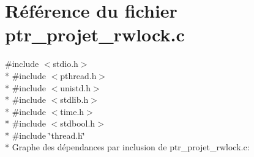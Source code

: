 \section{Référence du fichier ptr\+\_\+projet\+\_\+rwlock.\+c}
\label{ptr__projet__rwlock_8c}
{\ttfamily \#include $<$stdio.\+h$>$}\\*
{\ttfamily \#include $<$pthread.\+h$>$}\\*
{\ttfamily \#include $<$unistd.\+h$>$}\\*
{\ttfamily \#include $<$stdlib.\+h$>$}\\*
{\ttfamily \#include $<$time.\+h$>$}\\*
{\ttfamily \#include $<$stdbool.\+h$>$}\\*
{\ttfamily \#include \char`\"{}thread.\+h\char`\"{}}\\*
Graphe des dépendances par inclusion de ptr\+\_\+projet\+\_\+rwlock.\+c\+:
